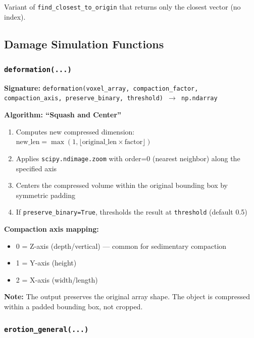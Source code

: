 \documentclass[12pt,a4paper]{article}
\begin{document}
Variant of \texttt{find\_closest\_to\_origin} that returns only the closest vector (no index).

\subsection{Damage Simulation Functions}

\subsubsection{\texttt{deformation(...)}}

\textbf{Signature:} \texttt{deformation(voxel\_array, compaction\_factor, compaction\_axis, preserve\_binary, threshold) $\rightarrow$ np.ndarray}

\textbf{Algorithm: ``Squash and Center''}

\begin{enumerate}
  \item Computes new compressed dimension: $\text{new\_len} = \max(1, \lfloor \text{original\_len} \times \text{factor} \rfloor)$
  \item Applies \texttt{scipy.ndimage.zoom} with order=0 (nearest neighbor) along the specified axis
  \item Centers the compressed volume within the original bounding box by symmetric padding
  \item If \texttt{preserve\_binary=True}, thresholds the result at \texttt{threshold} (default 0.5)
\end{enumerate}

\textbf{Compaction axis mapping:}
\begin{itemize}
  \item 0 = Z-axis (depth/vertical) --- common for sedimentary compaction
  \item 1 = Y-axis (height)
  \item 2 = X-axis (width/length)
\end{itemize}

\textbf{Note:} The output preserves the original array shape. The object is compressed within a padded bounding box, not cropped.

\subsubsection{\texttt{erotion\_general(...)}}
\end{document}
